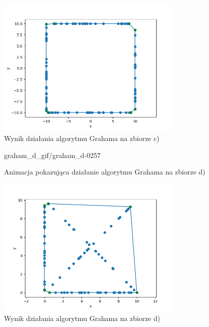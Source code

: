 \documentclass[a4paper]{article}
\begin{document}
\begin{figure}[H]
    \centering
    \includegraphics[width=0.8\textwidth]{graham/graham_c_png.png}
    \caption{Wynik działania algorytmu Grahama na zbiorze c)}
    \label{fig:graham_c}
\end{figure}

\begin{figure}[H]
    {graham_d_gif/graham_d-}{0}{257}
    \centering
    \caption{Animacja pokazująca działanie algorytmu Grahama na zbiorze d)}
    \label{fig:anim_graham_d}
\end{figure}

\begin{figure}[H]
    \centering
    \includegraphics[width=0.8\textwidth]{graham/graham_d_png.png}
    \caption{Wynik działania algorytmu Grahama na zbiorze d)}
    \label{fig:graham_d}
\end{figure}
\end{document}
